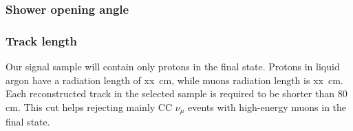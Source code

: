 \subsubsection{Shower opening angle}

\subsubsection{Track length}
Our signal sample will contain only protons in the final state. Protons in liquid argon have a radiation length of xx~cm, while muons radiation length is xx~cm. Each reconstructed track in the selected sample is required to be shorter than 80 cm. This cut helps rejecting mainly CC $\nu_{\mu}$ events with high-energy muons in the final state.



